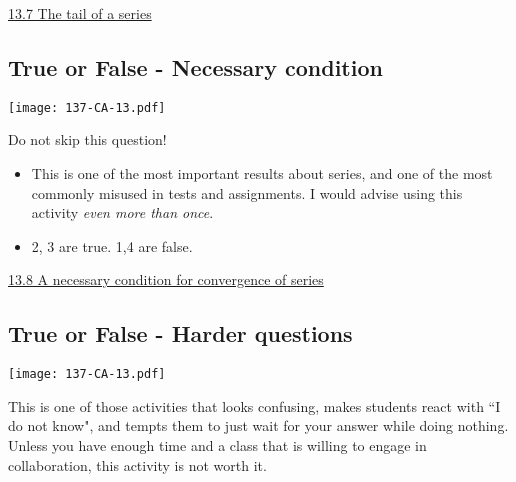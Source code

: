 \documentclass[11pt]{article}
\newcommand{\nl}{\hfill \vspace{-1.1\baselineskip}} %
\newcommand{\vvii}{\hspace{8mm} \href{https://www.youtube.com/watch?v=9njCb8usB94&list=PLlwePzQY_wW-FJMnD_ybkXU_jZLVtZttI&index=7}{13.7 The tail of a series} }
\newcommand{\vviii}{\hspace{8mm} \href{https://www.youtube.com/watch?v=kP9qHkTSNpI&list=PLlwePzQY_wW-FJMnD_ybkXU_jZLVtZttI&index=8}{13.8 A necessary condition for convergence of series} }
\begin{document}
\begin{videos}
\vvii
\end{videos}

\newpage
\subsection{True or False - Necessary condition}

\begin{center}
{ \texttt{[image: 137-CA-13.pdf]}} 
\end{center}

\begin{warning}
Do not skip this question!
\end{warning}

\begin{comments}
\nl
	\begin{itemize}
		\item   This is one of the most important results about series, and one of the most commonly misused in tests and assignments.  I would advise using this activity \emph{even more than once}.
		
		\item  2, 3 are true.  1,4 are false.
	\end{itemize}
\end{comments}

\begin{videos}
\vviii
\end{videos}

\newpage
\subsection{True or False - Harder questions}

\begin{center}
{ \texttt{[image: 137-CA-13.pdf]}} 
\end{center}

\begin{warning}
	This is one of those activities that looks confusing, makes students react with ``I do not know", and tempts them to just wait for your answer while doing nothing.  Unless you have enough time and a class that is willing to engage in collaboration, this activity is not worth it.
\end{warning}
\end{document}
